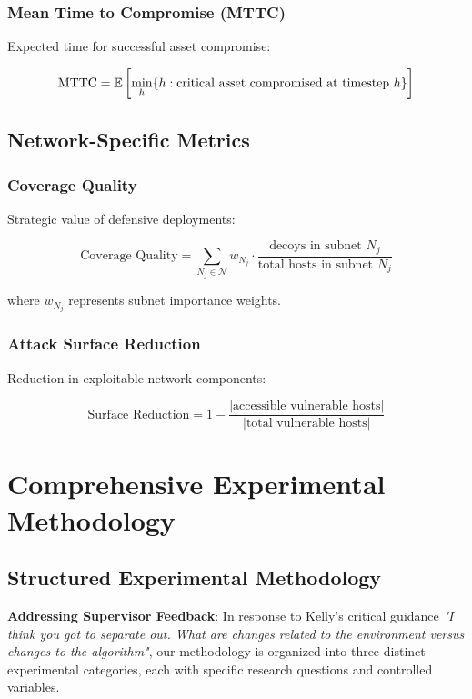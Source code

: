 \documentclass[12pt,twoside]{article}
\begin{document}
\subsubsection{Mean Time to Compromise (MTTC)}
Expected time for successful asset compromise:

\begin{equation}
\text{MTTC} = \mathbb{E}\left[\min_h \{h : \text{critical asset compromised at timestep } h\}\right]
\end{equation}

\subsection{Network-Specific Metrics}

\subsubsection{Coverage Quality}
Strategic value of defensive deployments:

\begin{equation}
\text{Coverage Quality} = \sum_{N_j \in \mathcal{N}} w_{N_j} \cdot \frac{\text{decoys in subnet } N_j}{\text{total hosts in subnet } N_j}
\end{equation}

where $w_{N_j}$ represents subnet importance weights.

\subsubsection{Attack Surface Reduction}
Reduction in exploitable network components:

\begin{equation}
\text{Surface Reduction} = 1 - \frac{|\text{accessible vulnerable hosts}|}{|\text{total vulnerable hosts}|}
\end{equation}

\section{Comprehensive Experimental Methodology}

\subsection{Structured Experimental Methodology}

\textbf{Addressing Supervisor Feedback}: In response to Kelly's critical guidance \textit{"I think you got to separate out. What are changes related to the environment versus changes to the algorithm"}, our methodology is organized into three distinct experimental categories, each with specific research questions and controlled variables.
\end{document}
